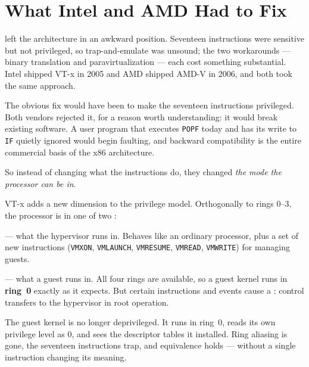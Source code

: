 \section{What Intel and AMD Had to Fix}

 left the architecture in an awkward position. Seventeen
instructions were sensitive but not privileged, so trap-and-emulate was
unsound; the two workarounds --- binary translation and paravirtualization ---
each cost something substantial. Intel shipped VT-x in 2005 and AMD shipped
AMD-V in 2006, and both took the same approach.

The obvious fix would have been to make the seventeen instructions privileged.
Both vendors rejected it, for a reason worth understanding: it would break
existing software. A user program that executes \texttt{POPF} today and has its
write to \texttt{IF} quietly ignored would begin faulting, and backward
compatibility is the entire commercial basis of the x86 architecture.

So instead of changing what the instructions do, they changed \emph{the mode
the processor can be in}.

\begin{definitionbox}
VT-x adds a new dimension to the privilege model. Orthogonally to rings 0--3,
the processor is in one of two :

\begin{tight}
  \item {} --- what the hypervisor runs in. Behaves like
        an ordinary processor, plus a set of new instructions
        (\texttt{VMXON}, \texttt{VMLAUNCH}, \texttt{VMRESUME}, \texttt{VMREAD},
        \texttt{VMWRITE}) for managing guests.
  \item {} --- what a guest runs in. All four rings
        are available, so a guest kernel runs in \textbf{ring~0} exactly as it
        expects. But certain instructions and events cause a :
        control transfers to the hypervisor in root operation.
\end{tight}

\smallskip
The guest kernel is no longer deprivileged. It runs in ring~0, reads its own
privilege level as 0, and sees the descriptor tables it installed. Ring
aliasing is gone, the seventeen instructions trap, and equivalence holds ---
without a single instruction changing its meaning.
\end{definitionbox}

